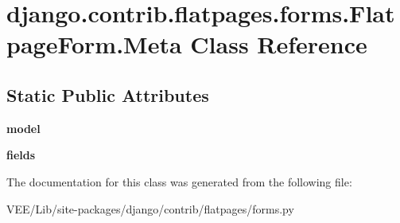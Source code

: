 \hypertarget{classdjango_1_1contrib_1_1flatpages_1_1forms_1_1_flatpage_form_1_1_meta}{}\section{django.\+contrib.\+flatpages.\+forms.\+Flatpage\+Form.\+Meta Class Reference}
\label{classdjango_1_1contrib_1_1flatpages_1_1forms_1_1_flatpage_form_1_1_meta}
\subsection*{Static Public Attributes}
\begin{DoxyCompactItemize}
\item 
\mbox{\label{classdjango_1_1contrib_1_1flatpages_1_1forms_1_1_flatpage_form_1_1_meta_a783256d644c4cb1d656d65d24e6be251}} 
{\bfseries model}
\item 
\mbox{\label{classdjango_1_1contrib_1_1flatpages_1_1forms_1_1_flatpage_form_1_1_meta_abb448c6fea633bf7affbb4cecd91db75}} 
{\bfseries fields}
\end{DoxyCompactItemize}


The documentation for this class was generated from the following file\+:\begin{DoxyCompactItemize}
\item 
V\+E\+E/\+Lib/site-\/packages/django/contrib/flatpages/forms.\+py\end{DoxyCompactItemize}
